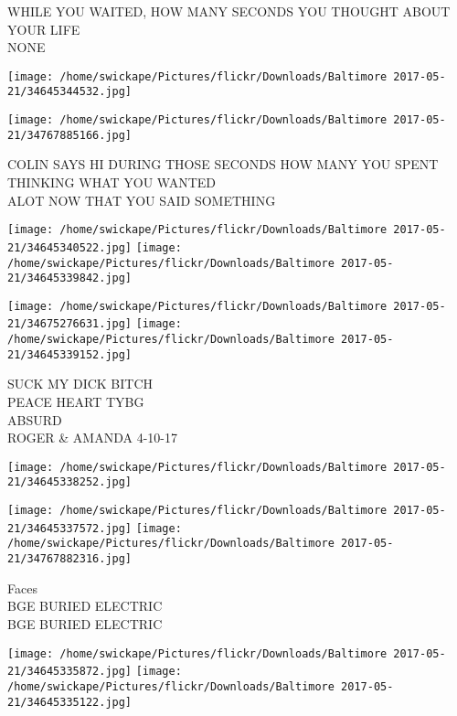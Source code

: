 \documentclass[10pt,letterpaper]{article}
\begin{document}
WHILE YOU WAITED, HOW MANY SECONDS YOU THOUGHT ABOUT YOUR LIFE\\
NONE\\
\pagebreak

\texttt{[image: /home/swickape/Pictures/flickr/Downloads/Baltimore 2017-05-21/34645344532.jpg]}

\vspace{0.25in}
\texttt{[image: /home/swickape/Pictures/flickr/Downloads/Baltimore 2017-05-21/34767885166.jpg]}

COLIN SAYS HI DURING THOSE SECONDS HOW MANY YOU SPENT THINKING WHAT YOU WANTED\\
ALOT NOW THAT YOU SAID SOMETHING\\
\pagebreak

\texttt{[image: /home/swickape/Pictures/flickr/Downloads/Baltimore 2017-05-21/34645340522.jpg]}
\texttt{[image: /home/swickape/Pictures/flickr/Downloads/Baltimore 2017-05-21/34645339842.jpg]}

\texttt{[image: /home/swickape/Pictures/flickr/Downloads/Baltimore 2017-05-21/34675276631.jpg]}
\texttt{[image: /home/swickape/Pictures/flickr/Downloads/Baltimore 2017-05-21/34645339152.jpg]}

SUCK MY DICK BITCH\\
PEACE HEART TYBG\\
ABSURD\\
ROGER \& AMANDA 4{-}10{-}17\\
\pagebreak

\texttt{[image: /home/swickape/Pictures/flickr/Downloads/Baltimore 2017-05-21/34645338252.jpg]}

\vspace{0.25in}
\texttt{[image: /home/swickape/Pictures/flickr/Downloads/Baltimore 2017-05-21/34645337572.jpg]}
\texttt{[image: /home/swickape/Pictures/flickr/Downloads/Baltimore 2017-05-21/34767882316.jpg]}

Faces\\
BGE BURIED ELECTRIC\\
BGE BURIED ELECTRIC\\
\pagebreak

\texttt{[image: /home/swickape/Pictures/flickr/Downloads/Baltimore 2017-05-21/34645335872.jpg]}
\texttt{[image: /home/swickape/Pictures/flickr/Downloads/Baltimore 2017-05-21/34645335122.jpg]}
\end{document}
